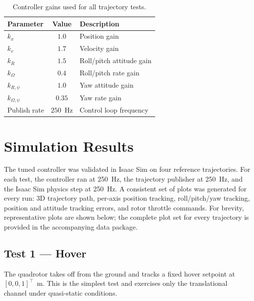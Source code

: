 \documentclass[11pt]{article}
\theoremstyle{remark}
\begin{document}
\begin{table}[H]
    \centering
    \caption{Controller gains used for all trajectory tests.}
    \label{tab:gains}
    \begin{tabular}{lcl}
        \toprule
        Parameter        & Value  & Description \\
        \midrule
        $k_x$            & $1.0$  & Position gain \\
        $k_v$            & $1.7$  & Velocity gain \\
        $k_R$            & $1.5$  & Roll/pitch attitude gain \\
        $k_\Omega$       & $0.4$  & Roll/pitch rate gain \\
        $k_{R,\psi}$     & $1.0$  & Yaw attitude gain \\
        $k_{\Omega,\psi}$& $0.35$ & Yaw rate gain \\
        Publish rate     & $250$~Hz & Control loop frequency \\
        \bottomrule
    \end{tabular}
\end{table}

\section{Simulation Results}
\label{sec:results}

The tuned controller was validated in Isaac Sim on four reference trajectories. For each test, the controller ran at 250~Hz, the trajectory publisher at 250~Hz, and the Isaac Sim physics step at 250~Hz. A consistent set of plots was generated for every run: 3D trajectory path, per-axis position tracking, roll/pitch/yaw tracking, position and attitude tracking errors, and rotor throttle commands. For brevity, representative plots are shown below; the complete plot set for every trajectory is provided in the accompanying data package.

\subsection{Test 1 --- Hover}
The quadrotor takes off from the ground and tracks a fixed hover setpoint at $[0,0,1]^\top$~m. This is the simplest test and exercises only the translational channel under quasi-static conditions.
\end{document}
